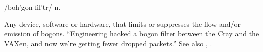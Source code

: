  /boh'gon fil'tr/ n.

Any device, software or hardware, that limits or suppresses the flow and/or
emission of bogons. ``Engineering hacked a bogon filter between the Cray and the
VAXen, and now we're getting fewer dropped packets.'' See also
, .

